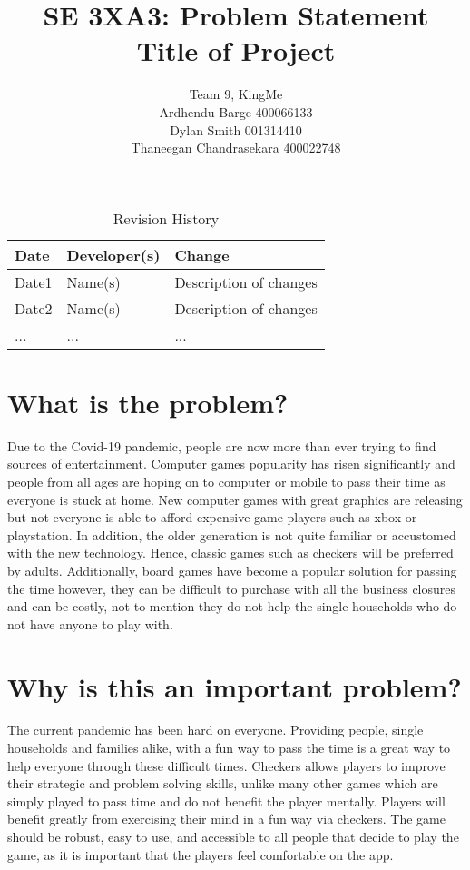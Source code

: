 \documentclass{article}
\title{SE 3XA3: Problem Statement\\Title of Project}
\author{Team 9, KingMe
		\\ Ardhendu Barge 400066133
		\\ Dylan Smith 001314410
		\\ Thaneegan Chandrasekara 400022748
}
\date{}
\begin{document}
\begin{table}[hp]
\caption{Revision History} \label{TblRevisionHistory}
\begin{tabularx}{\textwidth}{llX}
\toprule
\textbf{Date} & \textbf{Developer(s)} & \textbf{Change}\\
\midrule
Date1 & Name(s) & Description of changes\\
Date2 & Name(s) & Description of changes\\
... & ... & ...\\
\bottomrule
\end{tabularx}
\end{table}

\newpage

\maketitle

\section{What is the problem?}
Due to the Covid-19 pandemic, people are now more than ever trying to find sources of entertainment. Computer games popularity has risen significantly and people from all ages are hoping on to computer or mobile to pass their time as everyone is stuck at home. New computer games with great graphics are releasing but not everyone is able to afford expensive game players such as xbox or playstation. In addition, the older generation is not quite familiar or accustomed  with the new technology. Hence, classic games such as checkers will be preferred by adults. Additionally, board games have become a popular solution for passing the time however, they can be difficult to purchase with all the business closures and can be costly, not to mention they do not help the single households who do not have anyone to play with.

\section{Why is this an important problem?}
The current pandemic has been hard on everyone. Providing people, single households and families alike, with a fun way to pass the time is a great way to help everyone through these difficult times. Checkers allows players to improve their strategic and problem solving skills, unlike many other games which are simply played to pass time and do not benefit the player mentally. Players will benefit greatly from exercising their mind in a fun way via checkers. The game should be robust, easy to use, and accessible to all people that decide to play the game, as it is important that the players feel comfortable on the app.
\end{document}
